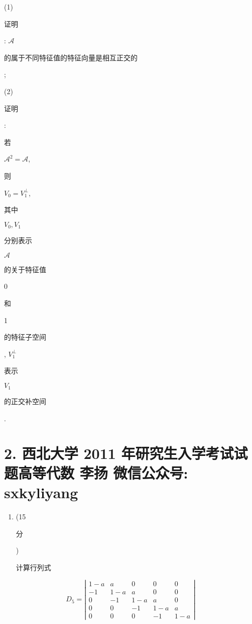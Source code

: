 \documentclass[10pt]{article}
\begin{document}
(1) \begin{CJK}{UTF8}{mj}证明\end{CJK}: $\mathscr{A}$ \begin{CJK}{UTF8}{mj}的属于不同特征值的特征向量是相互正交的\end{CJK};

(2) \begin{CJK}{UTF8}{mj}证明\end{CJK}: \begin{CJK}{UTF8}{mj}若\end{CJK} $\mathscr{A}^{2}=\mathscr{A}$, \begin{CJK}{UTF8}{mj}则\end{CJK} $V_{0}=V_{1}^{\perp}$, \begin{CJK}{UTF8}{mj}其中\end{CJK} $V_{0}, V_{1}$ \begin{CJK}{UTF8}{mj}分别表示\end{CJK} $\mathscr{A}$ \begin{CJK}{UTF8}{mj}的关于特征值\end{CJK} 0 \begin{CJK}{UTF8}{mj}和\end{CJK} 1 \begin{CJK}{UTF8}{mj}的特征子空间\end{CJK}, $V_{1}^{\perp}$ \begin{CJK}{UTF8}{mj}表示\end{CJK} $V_{1}$ \begin{CJK}{UTF8}{mj}的正交补空间\end{CJK}.

\section{2. 西北大学 2011 年研究生入学考试试题高等代数 
 李扬 
 微信公众号: sxkyliyang}
\begin{enumerate}
  \item (15 \begin{CJK}{UTF8}{mj}分\end{CJK}) \begin{CJK}{UTF8}{mj}计算行列式\end{CJK}
\end{enumerate}
$$
D_{5}=\left|\begin{array}{ccccc}
1-a & a & 0 & 0 & 0 \\
-1 & 1-a & a & 0 & 0 \\
0 & -1 & 1-a & a & 0 \\
0 & 0 & -1 & 1-a & a \\
0 & 0 & 0 & -1 & 1-a
\end{array}\right|
$$
\end{document}
